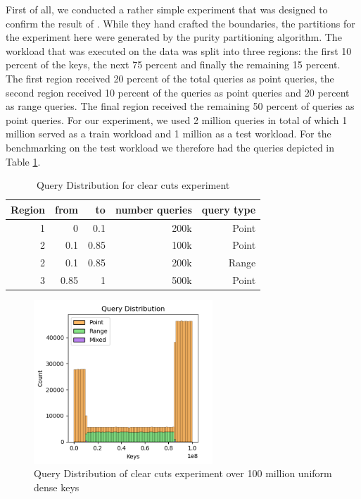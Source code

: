 First of all, we conducted a rather simple experiment that was designed to confirm the result of \citeauthor{Dittrich2021} \cite{Dittrich2021}. While they hand crafted the boundaries, the partitions for the experiment here were generated by the purity partitioning algorithm. The workload that was executed on the data was split into three regions: the first 10 percent of the keys, the next 75 percent and finally the remaining 15 percent. The first region received 20 percent of the total queries as point queries, the second region received 10 percent of the queries as point queries and 20 percent as range queries. The final region received the remaining 50 percent of queries as point queries. For our experiment, we used 2 million queries in total of which 1 million served as a train workload and 1 million as a test workload. For the benchmarking on the test workload we therefore had the queries depicted in Table \ref{tab:poc_wkl}.

\begin{table}[H]
\centering
\begin{tabular}{rrrrr}
\hline
Region & from & to   & number queries & query type \\ \hline
1      & 0    & 0.1  & 200k           & Point      \\
2      & 0.1  & 0.85 & 100k           & Point      \\
2      & 0.1  & 0.85 & 200k           & Range      \\
3      & 0.85 & 1    & 500k           & Point      \\ \hline
\end{tabular}
\caption{Query Distribution for clear cuts experiment}
\label{tab:poc_wkl}
\end{table}

\begin{figure}[H]
    \centering
    \includegraphics[width=0.6\textwidth]{figures/poc_dist.png}
    \caption{Query Distribution of clear cuts experiment over 100 million uniform dense keys}
    \label{fig:poc_dist}
\end{figure}

